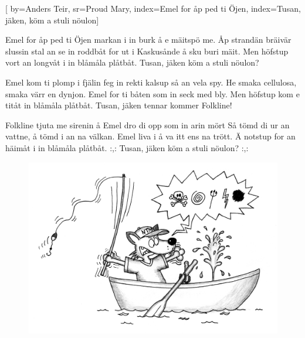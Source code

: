 

[ 		%
	by={Anders Teir},					%
	sr={Proud Mary},					%
	index={Emel for åp ped ti Öjen}, 						%
	index={Tusan, jäken, köm a stuli nöulon}]						%
	

\beginverse*						%
Emel for åp ped ti Öjen
markan i in burk å e mäitspö me.
Åp strandän bräivär slussin
stal an se in roddbåt
for ut i Kaskusånde å sku buri mäit.
Men höfstup vort an longvåt
i in blåmåla plåtbåt.
Tusan, jäken
köm a stuli nöulon?
\endverse							%

\beginverse*						%
Emel kom ti plomp i fjälin
feg in rekti kalsup så an vela spy.
He smaka cellulosa,
smaka värr en dynjon.
Emel for ti båten som in seck med bly.
Men höfstup kom e titåt
in blåmåla plåtbåt.
Tusan, jäken
tennar kommer Folkline!
\endverse							%

\beginverse*						%
Folkline tjuta me sirenin
å Emel dro di opp som in arin mört
Så tömd di ur an vattne,
å tömd i an na välkan.
Emel liva i å va itt ens na trött.
Ä notstup for an häimåt
i in blåmåla plåtbåt.
:,: Tusan, jäken
köm a stuli nöulon? :,:
\endverse							%
\endsong							%

\begin{figure}[!b]
\includegraphics[scale=.4]{../bilder/in_blamala_platbat.png} 
\end{figure}
